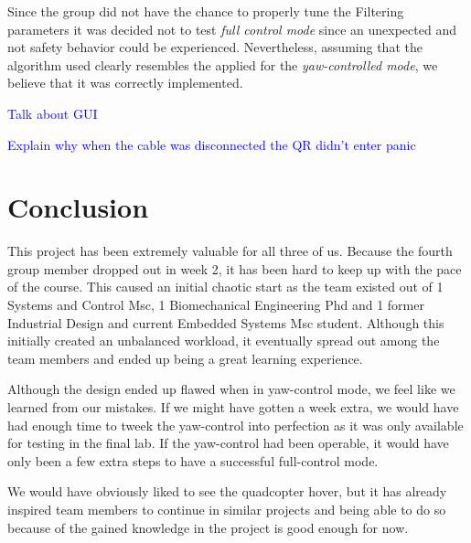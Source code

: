\documentclass{article}
\newcommand\todo[1]{\textcolor{blue}{#1}} %
\begin{document}
Since the group did not have the chance to properly tune the Filtering parameters it was decided not to test \textit{full control mode} since an unexpected and not safety behavior could be experienced. Nevertheless, assuming that the algorithm used clearly resembles the applied for the \textit{yaw-controlled mode}, we believe that it was correctly implemented.

\todo{Talk about GUI\\}


\todo{Explain why when the cable was disconnected the QR didn't enter panic} 




\section{Conclusion}
\label{sec:conclusion}

This project has been extremely valuable for all three of us. Because the fourth group member dropped out in week 2, it has been hard to keep up with the pace of the course. This caused an initial chaotic start as the team existed out of 1 Systems and Control Msc, 1 Biomechanical Engineering Phd and 1 former Industrial Design and current Embedded Systems Msc student. Although this initially created an unbalanced workload, it eventually spread out among the team members and ended up being a great learning experience. 

Although the design ended up flawed when in yaw-control mode, we feel like we learned from our mistakes. If we might have gotten a week extra, we would have had enough time to tweek the yaw-control into perfection as it was only available for testing in the final lab. If the yaw-control had been operable, it would have only been a few extra steps to have a successful full-control mode. 

We would have obviously liked to see the quadcopter hover, but it has already inspired team members to continue in similar projects and being able to do so because of the gained knowledge in the project is good enough for now. 



%






\end{document}
